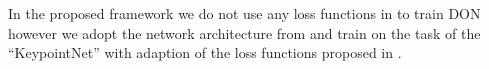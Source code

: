 In the proposed framework we do not use any loss functions in
\parencites{florence2018dense}{florence2020dense}{kupcsik2021supervised}{adrian2022efficient}{hadjivelichkov2021fully}{nerf-Supervision} to train DON
however we adopt the network architecture from \cite{florence2018dense} and train on the task of the ``KeypointNet''\cite{suwajanakorn2018discovery}
with adaption of the loss functions proposed in \parencites{suwajanakorn2018discovery}{zhao2020learning}.